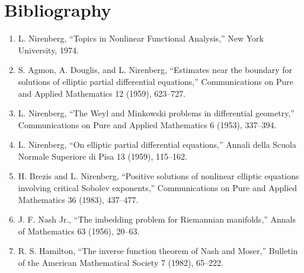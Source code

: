 \section*{Bibliography}
\begin{enumerate}
\item L. Nirenberg, ``Topics in Nonlinear Functional Analysis,'' New York University, 1974.
\item S. Agmon, A. Douglis, and L. Nirenberg, ``Estimates near the boundary for solutions of elliptic partial differential equations,'' Communications on Pure and Applied Mathematics 12 (1959), 623--727.
\item L. Nirenberg, ``The Weyl and Minkowski problems in differential geometry,'' Communications on Pure and Applied Mathematics 6 (1953), 337--394.
\item L. Nirenberg, ``On elliptic partial differential equations,'' Annali della Scuola Normale Superiore di Pisa 13 (1959), 115--162.
\item H. Brezis and L. Nirenberg, ``Positive solutions of nonlinear elliptic equations involving critical Sobolev exponents,'' Communications on Pure and Applied Mathematics 36 (1983), 437--477.
\item J. F. Nash Jr., ``The imbedding problem for Riemannian manifolds,'' Annals of Mathematics 63 (1956), 20--63.
\item R. S. Hamilton, ``The inverse function theorem of Nash and Moser,'' Bulletin of the American Mathematical Society 7 (1982), 65--222.
\end{enumerate}
